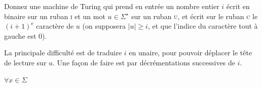 
\begingroup

\begin{exercice}\label{exo:turingmachines/expressiveness/at}


  \begin{question}
  \item Donnez une machine de Turing qui prend en entrée un nombre entier $i$ écrit en binaire sur un ruban \textsc{i}
    et un mot $u \in \Sigma^\star$ sur un ruban \textsc{u},
    et écrit sur le ruban \textsc{c} le $(i+1)^{\text{e}}$ caractère de $u$ (on supposera $|u| \ge i$, et que l'indice du caractère tout à gauche est 0).
  \end{question}

  \begin{correction}
    La principale difficulté est de traduire $i$ en unaire, pour pouvoir déplacer le tête de lecture sur $u$. Une façon de faire est par décrémentations successives de $i$.

    \begin{algorithm}[H]
    \end{algorithm}

    \begin{center}
      $\forall x\in \Sigma$
    \end{center}
  \end{correction}
  
\end{exercice}

\endgroup
\endinput
